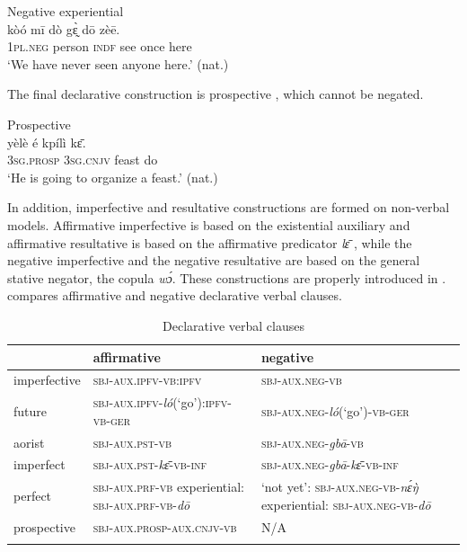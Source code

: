 \documentclass[output=paper,colorlinks,citecolor=brown]{langscibook}
\begin{document}
\ea\label{ex:mano:13}Negative experiential\\
    \gll kòó mī dò gɛ̰̀ dō zèē.  \\
         \textsc{1pl.neg} person \textsc{indf} see once here  \\
    \glt ‘We have never seen anyone here.’ (nat.)
\z

The final declarative construction is prospective , which cannot be negated.

\ea\label{ex:mano:14}Prospective\\
    \gll yèlè é kpílì kɛ̄.    \\
         3\textsc{sg.prosp} \textsc{3sg.cnjv} feast do    \\
    \glt ‘He is going to organize a feast.’ (nat.)
\z


In addition, imperfective and resultative constructions are formed on non-verbal models. Affirmative imperfective is based on the existential auxiliary and affirmative resultative is based on the affirmative predicator \textit{lɛ̄ }, while the negative imperfective and the negative resultative are based on the general stative negator, the copula \textit{wɔ́}. These constructions are properly introduced in .
 compares affirmative and negative declarative verbal clauses.

\begin{table} 
\small
\begin{tabularx}{\textwidth}{lQ@{}Q@{}}
\lsptoprule
& {\bfseries affirmative} & {\bfseries negative}\\
\midrule
imperfective & \textsc{sbj-aux.ipfv-vb:ipfv } & \textsc{sbj-aux.neg-vb }\\
\tablevspace
future & \textsc{sbj-aux.ipfv}-\textit{ló}(‘go’)\textsc{:ipfv}-\textsc{vb}{}-\textsc{ger} \textsc{} & \textsc{sbj-aux.neg}-\textit{ló}(‘go’)-\textsc{vb-ger} \textsc{}\\
\tablevspace
aorist & \textsc{sbj-aux.pst-vb } & \textsc{sbj-aux.neg-}\textit{gbā}\textsc{-vb} \textsc{}\\
\tablevspace
imperfect & \textsc{sbj-aux.pst-}\textit{kɛ̄}\textsc{-vb-inf} \textsc{} & \textsc{sbj-aux.neg-}\textit{gbā}\textsc{-}\textit{kɛ̄}\textsc{-vb-inf} \textsc{}\\
\tablevspace
perfect & \textsc{sbj-aux.prf-vb } \newline experiential\textsc{:} \textsc{sbj-aux.prf-vb-}\textit{dō}  & ‘not yet’: \textsc{sbj-aux.neg-vb-}\textit{nɛ́ŋ̀ }  \newline experiential: \textsc{sbj-aux.neg-vb}-\textit{dō} \\
\tablevspace
prospective & \textsc{sbj-aux.prosp-aux.cnjv-vb } & N/A\\
\lspbottomrule
\end{tabularx}
\caption{Declarative verbal clauses}
\label{tab:mano:1}
\end{table}
\end{document}
